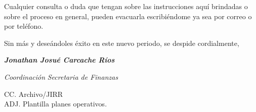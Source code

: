 \documentclass[12pt]{article}
\begin{document}
Cualquier consulta o duda que tengan sobre las instrucciones aquí brindadas o sobre el proceso en general, pueden evacuarla escribiéndome ya sea por correo o por teléfono.\par
Sin más y deseándoles éxito en este nuevo periodo, se despide cordialmente,\par
\bigskip
\bigskip
\bigskip
\begin{spacing}{1}
\textit{\textbf{Jonathan Josué Carcache Ríos}}\par
\textit{Coordinación}
\textit{Secretaria de Finanzas}
\end{spacing}
\medskip
\begin{flushleft}\begin{spacing}{1}
 \scriptsize{CC. Archivo/JIRR\\
 ADJ. Plantilla planes operativos.

 }
\end{spacing}\end{flushleft}
%
%
\end{document}
